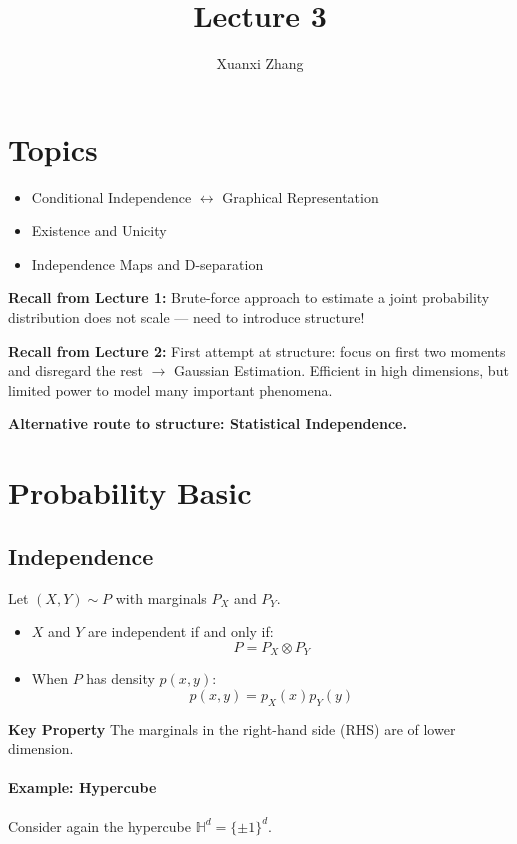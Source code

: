 \documentclass{article}%
\title{\huge Lecture 3 \\
\normalsize}
\author{Xuanxi Zhang}
\begin{document}
\maketitle
\section*{Topics}
\begin{itemize}
    \item Conditional Independence $\leftrightarrow$ Graphical Representation
    \item Existence and Unicity
    \item Independence Maps and D-separation
\end{itemize}

\textbf{Recall from Lecture 1:} Brute-force approach to estimate a joint probability distribution does not scale — need to introduce structure!

\textbf{Recall from Lecture 2:} First attempt at structure: focus on first two moments and disregard the rest $\rightarrow$ Gaussian Estimation. Efficient in high dimensions, but limited power to model many important phenomena.

\textbf{Alternative route to structure: Statistical Independence.}

\section{Probability Basic}

\subsection{Independence}
Let $(X, Y) \sim P$ with marginals $P_X$ and $P_Y$.

\begin{itemize}
    \item $X$ and $Y$ are independent if and only if:
    \[
    P = P_X \otimes P_Y
    \]
    \item When $P$ has density $p(x,y)$:
    \[
    p(x,y) = p_X(x) p_Y(y)
    \]
\end{itemize}

\textbf{Key Property}
The marginals in the right-hand side (RHS) are of lower dimension.

\paragraph{Example: Hypercube}
Consider again the hypercube $\mathbb{H}^d = \{ \pm 1 \}^d$.
\end{document}
